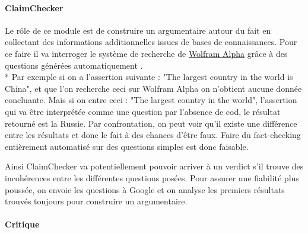 \paragraph{ClaimChecker}

Le rôle de ce module est de construire un argumentaire autour du fait en collectant des informations additionnelles issues de bases de connaissances. Pour ce faire il va interroger le système de recherche de \href{https://www.wolframalpha.com/about.html}{Wolfram Alpha} grâce à des questions générées automatiquement \cite{heilman2009question}. 
\\*
Par exemple si on a l'assertion suivante : "The largest country in the world is China", et que l'on recherche ceci sur Wolfram Alpha on n'obtient aucune donnée concluante. Mais si on entre ceci : "The largest country in the world", l'assertion qui va être interprétée comme une question par l'absence de cod, le résultat retourné est la Russie. Par confrontation, on peut voir qu'il existe une différence entre les résultats et donc le fait à des chances d'être faux. Faire du fact-checking entièrement automatisé sur des questions simples est donc faisable.

Ainsi ClaimChecker va potentiellement pouvoir arriver à un verdict s'il trouve des incohérences entre les différentes questions posées. Pour assurer une fiabilité plus poussée, on envoie les questions à Google et on analyse les premiers résultats trouvés toujours pour construire un argumentaire.

\paragraph{Critique}

